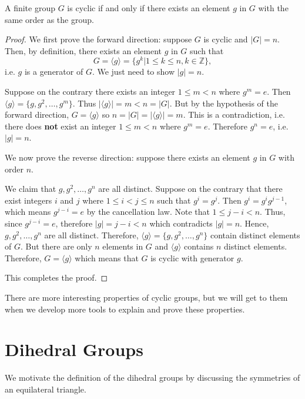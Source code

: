 \begin{theorem}\label{thrm-cyclic-group-has-element-with-same-order}
    A finite group $G$ is cyclic if and only if there exists an element $g$ in $G$ with the same order as the group.
\end{theorem}
\begin{proof}
    We first prove the forward direction: suppose $G$ is cyclic and $|G| = n$. Then, by definition, there exists an element $g$ in $G$ such that
    \[
        G = \langle g \rangle = \{g^k \vert 1 \leq k \leq n, k \in \mathbb{Z}\},
    \]
    i.e. $g$ is a generator of $G$. We just need to show $|g| = n$.

    Suppose on the contrary there exists an integer $1 \leq m < n$ where $g^m = e$. Then $\langle g \rangle = \{g, g^2, \dots, g^m\}$. Thus $|\langle g \rangle| = m < n = |G|$. But by the hypothesis of the forward direction, $G = \langle g \rangle$ so $n = |G| = |\langle g \rangle| = m$. This is a contradiction, i.e. there does \textbf{not} exist an integer $1 \leq m < n$ where $g^m = e$. Therefore $g^n = e$, i.e. $|g| = n$.

    We now prove the reverse direction: suppose there exists an element $g$ in $G$ with order $n$.
    
    We claim that $g, g^2, \dots, g^n$ are all distinct. Suppose on the contrary that there exist integers $i$ and $j$ where $1 \leq i < j \leq n$ such that $g^i = g^j$. Then $g^i = g^ig^{j-1}$, which means $g^{j-i} = e$ by the cancellation law. Note that $1 \leq j - i < n$. Thus, since $g^{j-i} = e$, therefore $|g| = j - i < n$ which contradicts $|g| = n$. Hence, $g, g^2, \dots, g^n$ are all distinct. Therefore, $\langle g \rangle = \{g, g^2, \dots, g^n\}$ contain distinct elements of $G$. But there are only $n$ elements in $G$ and $\langle g \rangle$ contains $n$ distinct elements. Therefore, $G = \langle g \rangle$ which means that $G$ is cyclic with generator $g$.

    This completes the proof.
\end{proof}

There are more interesting properties of cyclic groups, but we will get to them when we develop more tools to explain and prove these properties.

\newpage

\section{Dihedral Groups}
We motivate the definition of the dihedral groups by discussing the symmetries of an equilateral triangle.

